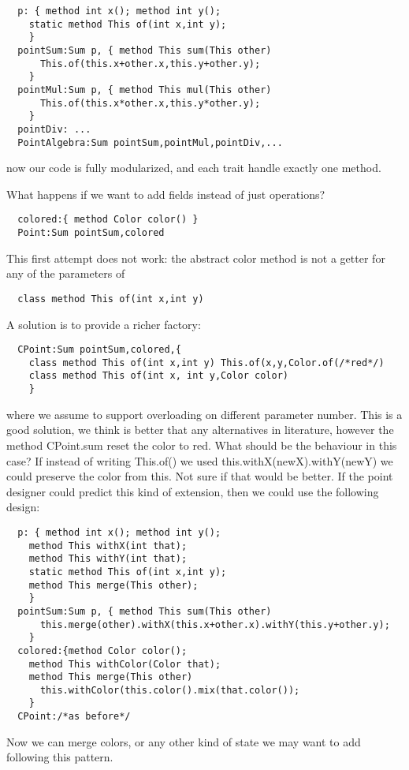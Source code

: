 \begin{lstlisting}
  p: { method int x(); method int y();
    static method This of(int x,int y);
    }
  pointSum:Sum p, { method This sum(This other)
      This.of(this.x+other.x,this.y+other.y);
    }
  pointMul:Sum p, { method This mul(This other)
      This.of(this.x*other.x,this.y*other.y);
    }
  pointDiv: ...
  PointAlgebra:Sum pointSum,pointMul,pointDiv,...
\end{lstlisting}
      
now our code is fully modularized, and each trait handle exactly one method.

What happens if we want to add fields instead of just operations?

\begin{lstlisting}
  colored:{ method Color color() }
  Point:Sum pointSum,colored
\end{lstlisting}

This first attempt does not work: the abstract color method
is not a getter for any of the parameters of 

\begin{lstlisting}
  class method This of(int x,int y) 
\end{lstlisting}

A solution is to provide a richer factory:

\begin{lstlisting}
  CPoint:Sum pointSum,colored,{
    class method This of(int x,int y) This.of(x,y,Color.of(/*red*/)
    class method This of(int x, int y,Color color)
    }
\end{lstlisting}

where we assume to support overloading on different parameter number.
This is a good solution, we think is better that any alternatives in literature,
however the method CPoint.sum reset the color to red.
What should be the behaviour in this case?
If instead of writing This.of() we used 
this.withX(newX).withY(newY) we could preserve the color from this.
Not sure if that would be better.
If the point designer could predict this kind of extension, then we could
use the following design:  
\begin{lstlisting}
  p: { method int x(); method int y();
    method This withX(int that);
    method This withY(int that);
    static method This of(int x,int y);
    method This merge(This other);
    }
  pointSum:Sum p, { method This sum(This other)
      this.merge(other).withX(this.x+other.x).withY(this.y+other.y);
    }
  colored:{method Color color();
    method This withColor(Color that);
    method This merge(This other)
      this.withColor(this.color().mix(that.color());
    }
  CPoint:/*as before*/
\end{lstlisting}  
  Now we can merge colors, or any other kind of state we may want to add
  following this pattern.
